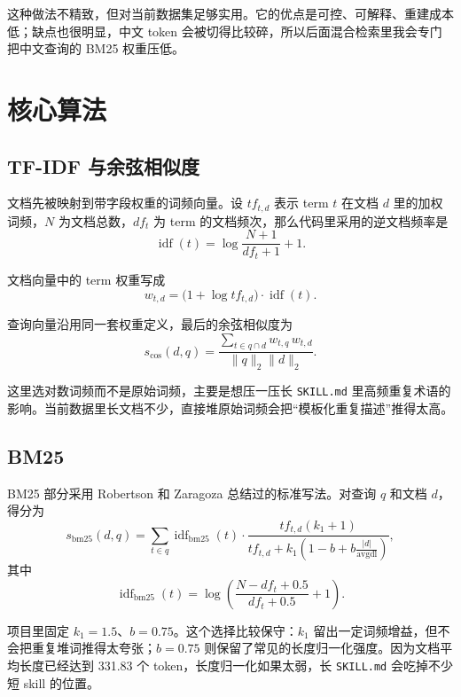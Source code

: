 这种做法不精致，但对当前数据集足够实用。它的优点是可控、可解释、重建成本低；缺点也很明显，中文 token 会被切得比较碎，所以后面混合检索里我会专门把中文查询的 BM25 权重压低。

\section{核心算法}
\subsection{TF-IDF 与余弦相似度}
文档先被映射到带字段权重的词频向量。设 $tf_{t,d}$ 表示 term $t$ 在文档 $d$ 里的加权词频，$N$ 为文档总数，$df_t$ 为 term 的文档频次，那么代码里采用的逆文档频率是
\begin{equation}
\label{eq:idf}
\operatorname{idf}(t)=\log \frac{N+1}{df_t+1}+1.
\end{equation}

文档向量中的 term 权重写成
\begin{equation}
\label{eq:tfidf-weight}
w_{t,d}=\bigl(1+\log tf_{t,d}\bigr)\cdot \operatorname{idf}(t).
\end{equation}

查询向量沿用同一套权重定义，最后的余弦相似度为
\begin{equation}
\label{eq:cosine}
s_{\cos}(d,q)=\frac{\sum_{t\in q\cap d} w_{t,q}\,w_{t,d}}{\lVert q\rVert_2\lVert d\rVert_2}.
\end{equation}

这里选对数词频而不是原始词频，主要是想压一压长 \texttt{SKILL.md} 里高频重复术语的影响。当前数据里长文档不少，直接堆原始词频会把“模板化重复描述”推得太高。

\subsection{BM25}
BM25 部分采用 Robertson 和 Zaragoza 总结过的标准写法。对查询 $q$ 和文档 $d$，得分为
\begin{equation}
\label{eq:bm25}
s_{\mathrm{bm25}}(d,q)=
\sum_{t\in q}
\operatorname{idf}_{\mathrm{bm25}}(t)\cdot
\frac{tf_{t,d}(k_1+1)}{tf_{t,d}+k_1\left(1-b+b\frac{|d|}{\mathrm{avgdl}}\right)},
\end{equation}
其中
\begin{equation}
\label{eq:bm25-idf}
\operatorname{idf}_{\mathrm{bm25}}(t)=
\log\left(\frac{N-df_t+0.5}{df_t+0.5}+1\right).
\end{equation}

项目里固定 $k_1=1.5$、$b=0.75$。这个选择比较保守：$k_1$ 留出一定词频增益，但不会把重复堆词推得太夸张；$b=0.75$ 则保留了常见的长度归一化强度。因为文档平均长度已经达到 331.83 个 token，长度归一化如果太弱，长 \texttt{SKILL.md} 会吃掉不少短 skill 的位置。

